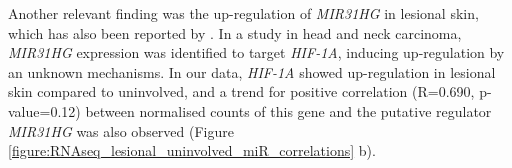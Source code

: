 


Another relevant finding was the up-regulation of \textit{MIR31HG} in lesional skin, which has also been reported by \parencite{Tsoi2015}. In a study in head and neck carcinoma, \textit{MIR31HG} expression was identified to target \textit{HIF-1A}, inducing up-regulation by an unknown mechanisms. In our data, \textit{HIF-1A} showed up-regulation in lesional skin compared to uninvolved, and a trend for positive correlation (R=0.690, p-value=0.12) between normalised counts of this gene and the putative regulator \textit{MIR31HG} was also observed (Figure \ref{figure:RNAseq_lesional_uninvolved_miR_correlations} b).





